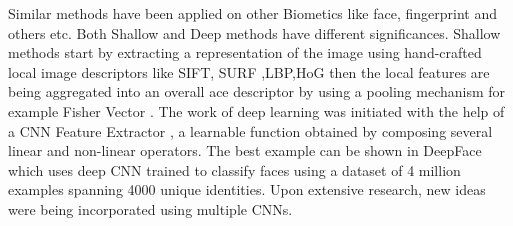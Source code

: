 Similar methods have been applied on other Biometics like face, fingerprint and others etc. Both Shallow and Deep methods have different significances. Shallow methods start by extracting a representation of the image using hand-crafted local image descriptors like SIFT, SURF ,LBP,HoG \cite{five,thirteen,LBP,HOG} then the local features are being aggregated into an overall ace descriptor by using a pooling mechanism for example Fisher Vector \cite{fisher}\cite{parkhi}. The work of deep learning was initiated with the help of a CNN Feature Extractor , a learnable function obtained by composing several linear and non-linear operators. The best example can be shown in DeepFace\cite{deepface} which uses deep CNN trained to classify faces using a dataset of 4 million examples spanning 4000 unique identities. Upon extensive research, new ideas were being incorporated using multiple CNNs\cite{parkhi}.

